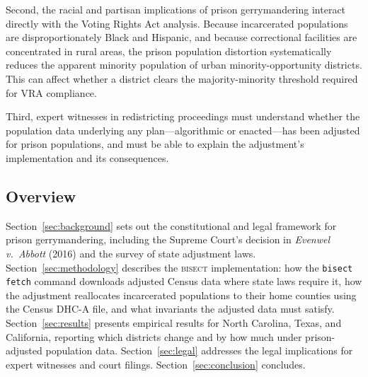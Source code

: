 Second, the racial and partisan implications of prison gerrymandering
interact directly with the Voting Rights Act analysis. Because incarcerated
populations are disproportionately Black and Hispanic, and because
correctional facilities are concentrated in rural areas, the prison
population distortion systematically reduces the apparent minority
population of urban minority-opportunity districts. This can affect
whether a district clears the majority-minority threshold required for
VRA compliance.

Third, expert witnesses in redistricting proceedings must understand
whether the population data underlying any plan---algorithmic or
enacted---has been adjusted for prison populations, and must be able to
explain the adjustment's implementation and its consequences.

\subsection{Overview}

Section~\ref{sec:background} sets out the constitutional and legal framework
for prison gerrymandering, including the Supreme Court's decision in
\textit{Evenwel v.\ Abbott} (2016) and the survey of state adjustment laws.
Section~\ref{sec:methodology} describes the \textsc{bisect} implementation:
how the \texttt{bisect fetch} command downloads adjusted Census data where
state laws require it, how the adjustment reallocates incarcerated populations
to their home counties using the Census DHC-A file, and what invariants the
adjusted data must satisfy. Section~\ref{sec:results} presents empirical results
for North Carolina, Texas, and California, reporting which districts change
and by how much under prison-adjusted population data. Section~\ref{sec:legal}
addresses the legal implications for expert witnesses and court filings.
Section~\ref{sec:conclusion} concludes.
